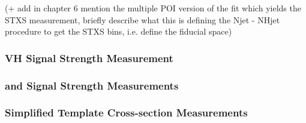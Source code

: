 (+ add in chapter 6 mention the multiple POI version of the fit which yields the
STXS measurement, briefly describe what this is defining the Njet - NHjet
procedure to get the STXS bins, i.e. define the fiducial space)


\subsubsection{VH Signal Strength Measurement}






\subsubsection{\WH and \ZH Signal Strength Measurements}



\subsubsection{Simplified Template Cross-section Measurements}




